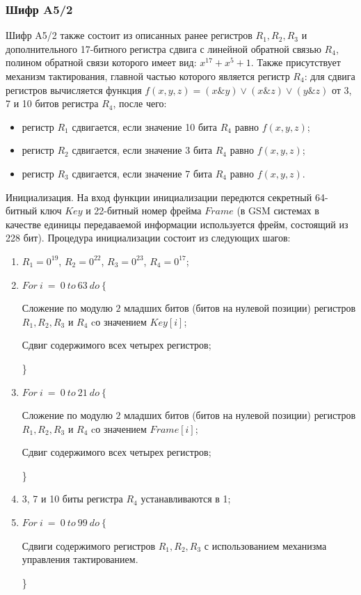 \documentclass{./civarticle}
\begin{document}
\subsubsection{Шифр A5/2}
Шифр A5/2 также состоит из описанных ранее регистров $R_1, R_2, R_3$ и дополнительного 17-битного регистра сдвига с линейной обратной связью $R_4$, полином обратной связи которого имеет вид: $x^{17} + x^5 + 1$. Также присутствует механизм тактирования, главной частью которого является регистр $R_4$: для сдвига регистров вычисляется функция $f(x, y, z) = (x \& y) \vee (x \& z) \vee (y \& z)$ от 3, 7 и 10 битов регистра $R_4$, после чего:
\begin{itemize}
    \item регистр $R_1$ сдвигается, если значение 10 бита $R_4$ равно $f(x, y, z)$;
    \item регистр $R_2$ сдвигается, если значение 3 бита $R_4$ равно $f(x, y, z)$;
    \item регистр $R_3$ сдвигается, если значение 7 бита $R_4$ равно $f(x, y, z)$.
\end{itemize}

Инициализация. На вход функции инициализации передются секретный 64-битный ключ $Key$ и 22-битный номер фрейма $Frame$ (в GSM системах в качестве единицы передаваемой информации используется фрейм, состоящий из 228 бит). Процедура инициализации состоит из следующих шагов: 
\begin{enumerate}
    \item $R_1 = 0^{19}$, $R_2 = 0^{22}$, $R_3 = 0^{23}$, $R_4 = 0^{17}$;
    \item $For~i~=~0~to~63~do~\{$
    
    \hspace{0.5cm}Сложение по модулю $2$ младших битов (битов на нулевой позиции) регистров $R_1, R_2, R_3$ и $R_4$ cо значением $Key[i]$;

    \hspace{0.5cm}Сдвиг содержимого всех четырех регистров;

    \}
    \item $For~i~=~0~to~21~do~\{$

    \hspace{0.5cm}Сложение по модулю $2$ младших битов (битов на нулевой позиции) регистров $R_1, R_2, R_3$ и $R_4$ cо значением $Frame[i]$;

    \hspace{0.5cm}Сдвиг содержимого всех четырех регистров;

    \}

    \item 3, 7 и 10 биты регистра $R_4$ устанавливаются в 1;
    
    \item $For~i~=~0~to~99~do~\{$

    \hspace{0.5cm}Сдвиги содержимого регистров $R_1, R_2, R_3$ с использованием механизма управления тактированием.

    \}
\end{enumerate}
\end{document}
